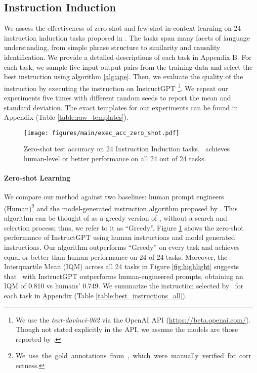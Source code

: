 \subsection{Instruction Induction}\label{sec:inst_induct}
We assess the effectiveness of zero-shot and few-shot in-context learning on 24 instruction induction tasks proposed in \citet{honovich2022instruction}. The tasks span many facets of language understanding, from simple phrase structure to similarity and causality identification. We provide a detailed descriptions of each task in Appendix B. For each task, we sample five input-output pairs from the training data and select the best instruction using algorithm \ref{alg:ape}. Then, we evaluate the quality of the instruction by executing the instruction on InstructGPT \footnote{We use the \textit{text-davinci-002} via the OpenAI API (\url{https://beta.openai.com/}). Though not stated explicitly in the API, we assume the models are those reported by \citet{ouyang2022training}.}. We repeat our experiments five times with different random seeds to report the mean and standard deviation. The exact templates for our experiments can be found in Appendix (Table \ref{table:raw_templates}).

\begin{figure}[t]
  \vspace{-0.25in}
  \centering
  \texttt{[image: figures/main/exec\_acc\_zero\_shot.pdf]}
  \caption{Zero-shot test accuracy on 24 Instruction Induction tasks. \algname~achieves human-level or better performance on all  24 out of 24 tasks.}\label{fig:main-zero-shot}
\end{figure}

\paragraph{Zero-shot Learning}
We compare our method against two baselines: human prompt engineers (Human)\footnote{\mbox{We use the gold annotations from \citet{honovich2022instruction}, which were manually verified for correctness.}} and the model-generated instruction algorithm proposed by \citet{honovich2022instruction}. This algorithm can be thought of as a greedy version of \algname, without a search and selection process; thus, we refer to it as ``Greedy''. Figure \ref{fig:main-zero-shot} shows the zero-shot performance of InstructGPT using human instructions and model generated instructions. Our algorithm outperforms ``Greedy'' on every task and achieves equal or better than human performance on 24 of 24 tasks. Moreover, the Interquartile Mean (IQM) \citep{agarwal2021deep} across all 24 tasks in Figure \ref{fig:highlight} suggests that \algname~with InstructGPT outperforms human-engineered prompts, obtaining an IQM of 0.810 vs humans' 0.749. We summarize the instruction selected by \algname~for each task in Appendix (Table \ref{table:best_instructions_all}).

